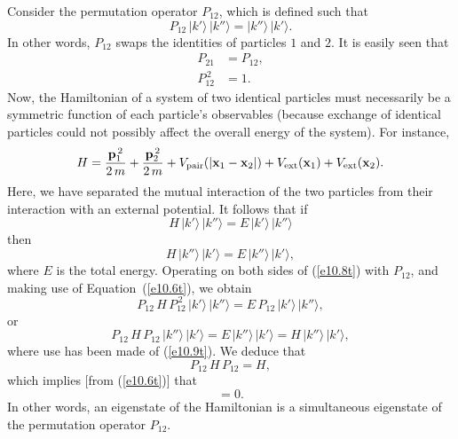 Consider the permutation operator $P_{12}$, which is defined such that
\begin{equation}
P_{12}\,|k'\rangle\,|k''\rangle = |k''\rangle\,|k'\rangle.
\end{equation}
In other words, $P_{12}$ swaps the identities of particles $1$ and $2$. It is
easily seen that
\begin{align}
P_{21} &= P_{12},\\[0.5ex]
P_{12}^{\,2} &= 1.\label{e10.6t}
\end{align}
Now, the Hamiltonian of a system of two identical particles must necessarily be a symmetric function of each particle's observables (because
exchange of identical particles could not possibly affect the overall energy of the system). For instance, 
\begin{equation}
H = \frac{{\bf p}_1^{\,2}}{2\,m} + \frac{{\bf p}_2^{\,2}}{2\,m} + V_{\rm pair} (|{\bf x}_1-{\bf x}_2|) + V_{\rm ext}({\bf x}_1)+ V_{\rm ext}({\bf x}_2).
\end{equation}
Here, we have separated the mutual interaction of the two particles from their interaction with an external potential. It follows that if
\begin{equation}\label{e10.8t}
H\,|k'\rangle\,|k''\rangle = E\,|k'\rangle\,|k''\rangle
\end{equation}
then
\begin{equation}\label{e10.9t}
H\,|k''\rangle\,|k'\rangle = E\,|k''\rangle\,|k'\rangle,
\end{equation}
where $E$ is the total energy. 
Operating on both sides of (\ref{e10.8t}) with $P_{12}$, and making use of Equation~(\ref{e10.6t}), we obtain
\begin{equation}
P_{12}\,H\,P_{12}^{\,2}\,|k'\rangle\,|k''\rangle = E\,P_{12}\,|k'\rangle\,|k''\rangle,
\end{equation}
or
\begin{equation}
P_{12}\,H\,P_{12}\,|k''\rangle\,|k'\rangle = E\,|k''\rangle\,|k'\rangle = H\,|k''\rangle\,|k'\rangle,
\end{equation}
where use has been made of (\ref{e10.9t}). 
We deduce that
\begin{equation}
P_{12}\,H\,P_{12} = H,
\end{equation}
which implies [from (\ref{e10.6t})] that
\begin{equation}
[H,P_{12}] = 0.
\end{equation}
In other words, an eigenstate of the Hamiltonian is a simultaneous eigenstate of the permutation operator $P_{12}$. 

